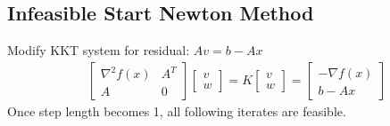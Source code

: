 \documentclass[8pt]{report}
\begin{document}
\begin{multicols*}{2}
  \subsection{Infeasible Start Newton Method}
  Modify KKT system for residual: $Av=b-Ax$
  \begin{align*}
    &\begin{bmatrix}
      \nabla^2 f(x) & A^T \\
      A & 0 
    \end{bmatrix}
          \begin{bmatrix}
            v\\ w
          \end{bmatrix}=
    K
    \begin{bmatrix}
      v\\ w
    \end{bmatrix} =
    \begin{bmatrix}
      -\nabla f(x)\\
      b-Ax
    \end{bmatrix}
  \end{align*}
  Once step length becomes 1, all following iterates are feasible.\\


\end{multicols*}
\end{document}
